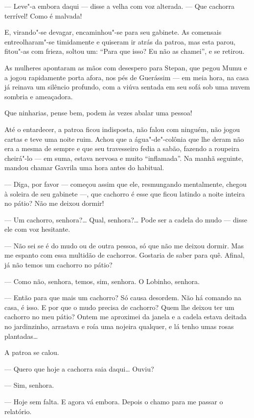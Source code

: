 --- Leve"-a embora daqui --- disse a velha com voz alterada. --- Que
cachorra terrível! Como é malvada!

E, virando"-se devagar, encaminhou"-se para seu gabinete. As comensais
entreolharam"-se timidamente e quiseram ir atrás da patroa, mas esta
parou, fitou"-as com frieza, soltou um: ``Para que isso? Eu não as
chamei'', e se retirou.

As mulheres apontaram as mãos com desespero para Stepan, que pegou Mumu
e a jogou rapidamente porta afora, nos pés de Guerássim --- em meia
hora, na casa já reinava um silêncio profundo, com a viúva sentada em
seu sofá sob uma nuvem sombria e ameaçadora.

Que ninharias, pense bem, podem às vezes abalar uma pessoa!

Até o entardecer, a patroa ficou indisposta, não falou com ninguém, não
jogou cartas e teve uma noite ruim. Achou que a água"-de"-colônia que lhe
deram não era a mesma de sempre e que seu travesseiro fedia a sabão,
fazendo a roupeira cheirá"-lo --- em suma, estava nervosa e muito
``inflamada''. Na manhã seguinte, mandou chamar Gavrila uma hora antes
do habitual.

--- Diga, por favor --- começou assim que ele, resmungando mentalmente,
chegou à soleira de seu gabinete ---, que cachorro é esse que ficou
latindo a noite inteira no pátio? Não me deixou dormir!

--- Um cachorro, senhora?\ldots{} Qual, senhora?\ldots{} Pode ser a cadela do mudo
--- disse ele com voz hesitante.

--- Não sei se é do mudo ou de outra pessoa, só que não me deixou
dormir. Mas me espanto com essa multidão de cachorros. Gostaria de saber
para quê. Afinal, já não temos um cachorro no pátio?

--- Como não, senhora, temos, sim, senhora. O Lobinho, senhora.

--- Então para que mais um cachorro? Só causa desordem. Não há comando
na casa, é isso. E por que o mudo precisa de cachorro? Quem lhe deixou
ter um cachorro no meu pátio? Ontem me aproximei da janela e a cadela
estava deitada no jardinzinho, arrastava e roía uma nojeira qualquer, e
lá tenho umas rosas plantadas\ldots{}

A patroa se calou.

--- Quero que hoje a cachorra saia daqui\ldots{} Ouviu?

--- Sim, senhora.

--- Hoje sem falta. E agora vá embora. Depois o chamo para me passar o
relatório.

